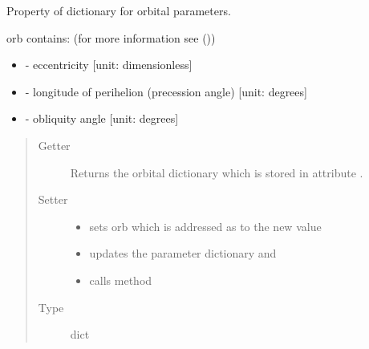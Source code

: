 \documentclass[a4paper,10pt,english]{sphinxmanual}
\begin{document}
\begin{fulllineitems}
\begin{fulllineitems}
\label{api/climlab.radiation:climlab.radiation.insolation.AnnualMeanInsolation.orb}
Property of dictionary for orbital parameters.

orb contains: (for more information see {\hyperref[api/climlab.solar:climlab.solar.orbital.OrbitalTable]{\emph{}}} ())
\begin{itemize}
\item {} 
 - eccentricity {[}unit: dimensionless{]}

\item {} 
 - longitude of perihelion (precession angle) {[}unit: degrees{]}

\item {} 
 - obliquity angle {[}unit: degrees{]}

\end{itemize}
\begin{quote}\begin{description}
\item[{Getter}] \leavevmode
Returns the orbital dictionary which is stored in attribute 
.

\item[{Setter}] \leavevmode\begin{itemize}
\item {} 
sets orb which is addressed as  to the new value

\item {} 
updates the parameter dictionary  and

\item {} 
calls method 

\end{itemize}

\item[{Type}] \leavevmode
dict

\end{description}\end{quote}

\end{fulllineitems}


\end{fulllineitems}

\end{document}
